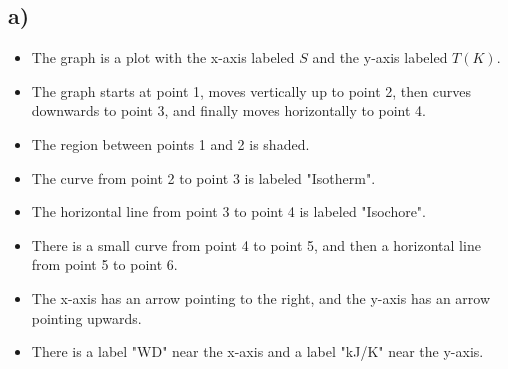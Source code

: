

\subsection*{a)}

\begin{itemize}
    \item The graph is a plot with the x-axis labeled \( S \) and the y-axis labeled \( T(K) \).
    \item The graph starts at point 1, moves vertically up to point 2, then curves downwards to point 3, and finally moves horizontally to point 4.
    \item The region between points 1 and 2 is shaded.
    \item The curve from point 2 to point 3 is labeled "Isotherm".
    \item The horizontal line from point 3 to point 4 is labeled "Isochore".
    \item There is a small curve from point 4 to point 5, and then a horizontal line from point 5 to point 6.
    \item The x-axis has an arrow pointing to the right, and the y-axis has an arrow pointing upwards.
    \item There is a label "WD" near the x-axis and a label "kJ/K" near the y-axis.
\end{itemize}
